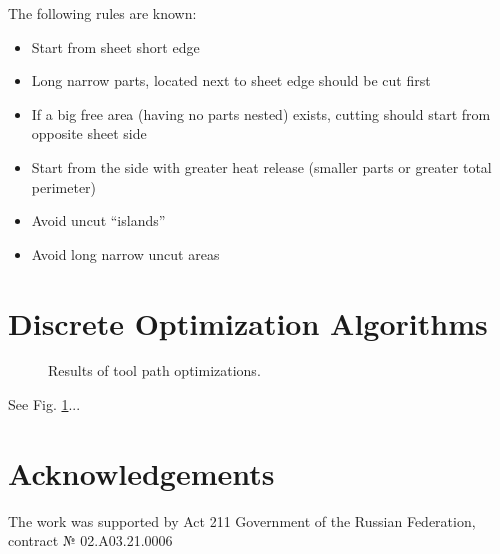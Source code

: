 \documentclass{../download/tPRS2e}
\begin{document}
The following rules are known:

\begin{itemize}
\item Start from sheet short edge
\item Long narrow parts, located next to sheet edge should be cut first
\item If a big free area (having no parts nested) exists, cutting should start from opposite sheet side
\item Start from the side with greater heat release (smaller parts or greater total perimeter)
\item Avoid uncut “islands”
\item Avoid long narrow uncut areas
\end{itemize}

\section{Discrete Optimization Algorithms}

\begin{figure}
\begin{center}
\caption{Results of tool path optimizations.} \label{nesting-results}
\end{center}
\end{figure}

See Fig. \ref{nesting-results}...

\section*{Acknowledgements}

The work was supported by Act 211 Government of the Russian Federation, contract № 02.A03.21.0006


\nocite{*}

\end{document}
